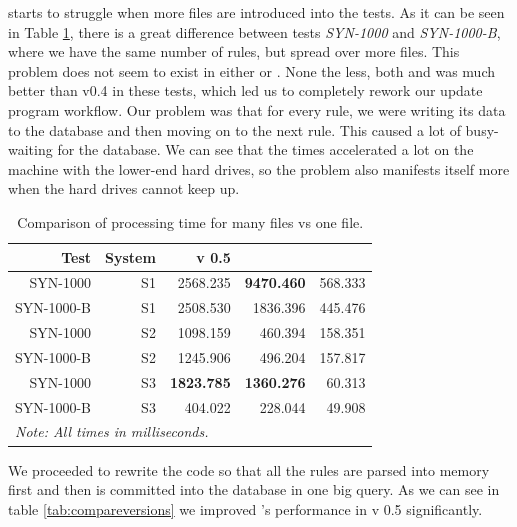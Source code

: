 \snortmanager{} starts to struggle when more files are introduced into the
tests. As it can be seen in Table \ref{tab:comparefiles}, there is a great
difference between tests \textit{SYN-1000} and \textit{SYN-1000-B}, where we have the same number of rules, but spread over
more files. This problem does not seem to exist in either \snowman{} or
\bhtb{}. None the less, both \snortmanager{} and \bhtb{} was much better than \snowman{}
v0.4 in these tests, which led us to completely rework our update program
workflow. Our problem was that for every rule, we were writing its data to the
database and then moving on to the next rule. This caused a lot of busy-waiting
for the database. We can see that the times accelerated a lot on the machine
with the lower-end hard drives, so the problem also manifests itself more when
the hard drives cannot keep up.

\renewcommand{\arraystretch}{1.5}

\begin{table}[h!]
  \centering
  \begin{tabular}{r|r|r|r|r}
Test & System & \snowman{} v 0.5 & \snortmanager{} & \bhtb{} \\
\hline
SYN-1000 & S1 & 2568.235 & \textbf{9470.460} & 568.333 \\
SYN-1000-B & S1 & 2508.530 & 1836.396 & 445.476 \\
\hline
SYN-1000 & S2 & 1098.159 & 460.394 & 158.351 \\
SYN-1000-B & S2 & 1245.906 & 496.204 & 157.817 \\
\hline
SYN-1000 & S3 & \textbf{1823.785} & \textbf{1360.276} & 60.313 \\
SYN-1000-B & S3 & 404.022 & 228.044 & 49.908 \\
	\hline
\multicolumn{5}{l}{\textit{Note: All times in milliseconds.}}
  \end{tabular}
  \caption{Comparison of processing time for many files vs one file.}
  \label{tab:comparefiles}
\end{table}

We proceeded to rewrite the code so that all the rules are parsed into
memory first and then is committed into the database in one big query. As we
can see in table \ref{tab:compareversions} we improved \snowman{}'s performance
in v 0.5 significantly. 

\renewcommand{\arraystretch}{1.5}

